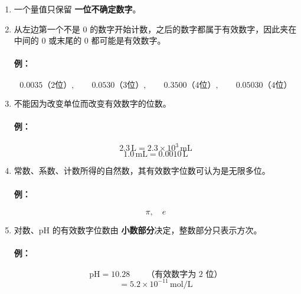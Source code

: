 \documentclass[12pt,a4paper]{article}
\numberwithin{equation}{section}
\begin{document}
\begin{enumerate}
    \item 一个量值只保留 \textbf{一位不确定数字}。
    
    \item 从左边第一个不是 $0$ 的数字开始计数，之后的数字都属于有效数字，因此夹在中间的 $0$ 或末尾的 $0$ 都可能是有效数字。
    
    \paragraph{例：}
\begin{equation}
    0.0035 \text{（2位）},\qquad
    0.0530 \text{（3位）},\qquad
    0.3500 \text{（4位）},\qquad
    0.05030 \text{（4位）}
\end{equation}
    
    \item 不能因为改变单位而改变有效数字的位数。
    
    \paragraph{例：}
\begin{equation}
    2.3\,\mathrm{L}=2.3\times 10^{3}\,\mathrm{mL}
\end{equation}
\begin{equation}
    1.0\,\mathrm{mL}=0.0010\,\mathrm{L}
\end{equation}
    
    \item 常数、系数、计数所得的自然数，其有效数字位数可认为是无限多位。
    
    \paragraph{例：}
\begin{equation}
    \pi,\quad e
\end{equation}
    
    \item 对数、$\mathrm{pH}$ 的有效数字位数由 \textbf{小数部分}决定，整数部分只表示方次。
    
    \paragraph{例：}
\begin{equation}
    \mathrm{pH}=10.28 \qquad \text{（有效数字为 2 位）}
\end{equation}
\begin{equation}
    [\mathrm{H}^+]=5.2\times 10^{-11}\,\mathrm{mol/L}
\end{equation}
\end{enumerate}
\end{document}

